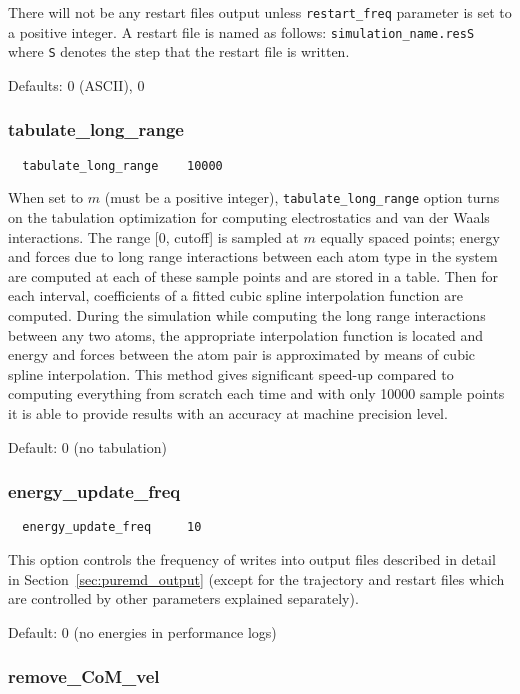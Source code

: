 \documentclass{article}
\begin{document}
There will not be any restart files output unless {\tt restart\_freq} 
parameter is set to a positive integer. A restart file is named as follows: 
{\tt simulation\_name.resS} where {\tt S} denotes the step that the restart 
file is written.

Defaults: 0 (ASCII), 0

\subsubsection{tabulate\_long\_range}
\label{sec:tabulate_long_range}

\begin{verbatim}
  tabulate_long_range    10000
\end{verbatim}
When set to $m$ (must be a positive integer), {\tt tabulate\_long\_range} 
option turns on the tabulation optimization for computing electrostatics and 
van der Waals interactions. The range [0, cutoff] is sampled at $m$ equally 
spaced points; energy and forces due to long range interactions between each 
atom type in the system are computed at each of these sample points and 
are stored in a table. Then for each interval, coefficients of a fitted
cubic spline interpolation function are computed. During the simulation 
while computing the long range interactions between any two atoms, 
the appropriate interpolation function is located and energy and forces 
between the atom pair is approximated by means of cubic spline interpolation.
This method gives significant speed-up compared to computing everything from 
scratch each time and with only 10000 sample points it is able to provide 
results with an accuracy at machine precision level.

Default: 0 (no tabulation)

\subsubsection{energy\_update\_freq}
\label{sec:energy_update_freq}

\begin{verbatim}
  energy_update_freq     10
\end{verbatim}
This option controls the frequency of writes into output files described 
in detail in Section~\ref{sec:puremd_output} (except for the trajectory 
and restart files which are controlled by other parameters explained
separately).

Default: 0 (no energies in performance logs)

\subsubsection{remove\_CoM\_vel}
\label{sec:remove_CoM_vel}
\end{document}

